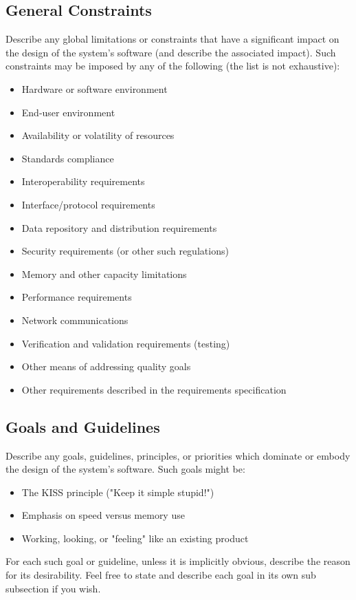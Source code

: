 \documentclass{FastFyp}
\begin{document}
\subsection{General Constraints}
Describe any global limitations or constraints that have a significant impact on the design of the system's software (and describe the associated impact). Such constraints may be imposed by any of the following (the list is not exhaustive):
\begin{itemize}
\item Hardware or software environment 
\item End-user environment 
\item Availability or volatility of resources 
\item Standards compliance 
\item Interoperability requirements 
\item Interface/protocol requirements 
\item Data repository and distribution requirements 
\item Security requirements (or other such regulations) 
\item Memory and other capacity limitations 
\item Performance requirements 
\item Network communications 
\item Verification and validation requirements (testing) 
\item Other means of addressing quality goals 
\item Other requirements described in the requirements specification 
\end{itemize}

\subsection{Goals and Guidelines}
Describe any goals, guidelines, principles, or priorities which dominate or embody the design of the system's software. Such goals might be:
\begin{itemize}
\item The KISS principle ("Keep it simple stupid!") 
\item Emphasis on speed versus memory use 
\item Working, looking, or "feeling" like an existing product
\end{itemize}
For each such goal or guideline, unless it is implicitly obvious, describe the reason for its desirability. Feel free to state and describe each goal in its own sub subsection if you wish.
\end{document}
